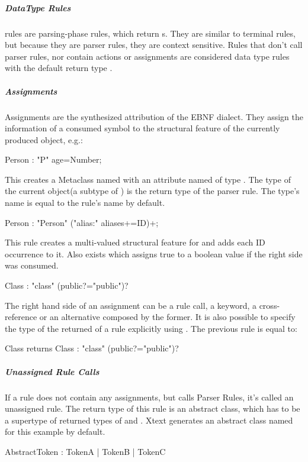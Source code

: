 \subparagraph{DataType Rules}
 rules are parsing-phase rules, which return s. They are similar to terminal rules, but because they are parser rules, they are context sensitive. Rules that don't call parser rules, nor contain actions or assignments are considered data type rules with the default return type . 
\begin{xtxt}
Number returns ecore::EInt : NUM ('.' NUM*)?;}
\end{xtxt}

\subparagraph{Assignments}
Assignments are the synthesized attribution of the EBNF dialect. They assign the information of a consumed symbol to the structural feature of the currently produced object, e.g.:
\begin{xtxt}
Person : "P" age=Number;
\end{xtxt}
This creates a Metaclass named  with an attribute named  of type . 
The type of the current object(a subtype of ) is the return type of the parser rule. The type's name is equal to the rule's name by default.
\begin{xtxt}
Person : "Person" ("alias:" aliases+=ID)+;
\end{xtxt}
This rule creates a multi-valued structural feature for  and adds each ID occurrence to it. Also  exists which assigns true to a boolean value if the right side was consumed.
\begin{xtxt}
Class : "class" (public?="public")?
\end{xtxt}
The right hand side of an assignment can be a rule call, a keyword, a cross-reference or an alternative composed by the former. It is also possible to specify the type of the returned  of a rule explicitly using . The previous rule is equal to:
\begin{xtxt}
Class returns Class : "class" (public?="public")?
\end{xtxt}

\subparagraph{Unassigned Rule Calls}
If a rule does not contain any assignments, but calls Parser Rules, it's called an unassigned rule. The return type of this rule is an abstract class, which has to be a supertype of returned types of  and . Xtext generates an abstract class named  for this example by default.
\begin{xtxt}
AbstractToken :	TokenA |	TokenB |	TokenC
\end{xtxt}


